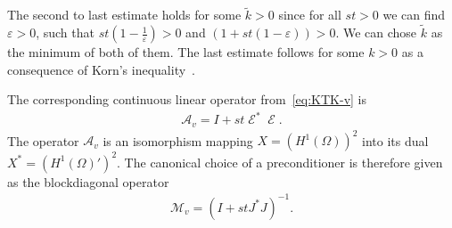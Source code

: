 \documentclass[twocolumn,envcountsame]{svjour3}
\newcommand{\MA}{\mathcal{A}}
\DeclareMathOperator{\symgrad}{\mathcal{E}}
\begin{document}
The second to last estimate holds for some $\tilde k>0$ since for all $st>0$ we can find $\varepsilon>0$, such that
$st\left(1-\frac{1}\varepsilon\right)>0$ and $(1+st(1-\varepsilon))>0$. We can chose $\tilde k$ as the
minimum of both of them. The last estimate follows for some $k>0$ as a consequence of Korn's
inequality~\cite{ciarlet2013linear}.

The corresponding continuous linear operator from~\eqref{eq:KTK-v} is
  \begin{align*}
    \MA_{v}= I+st\symgrad^*\symgrad.
  \end{align*}
The operator $\MA_{v}$ is an isomorphism mapping $X=(H^1(\Omega))^2$ into its dual 
$X^*=(H^{1}(\Omega)')^2$. 
The canonical
choice of a preconditioner is therefore given as the blockdiagonal operator
\begin{align*}
  \mathcal{M}_{v}=(I+stJ^*J)^{-1}.
\end{align*}
\end{document}
